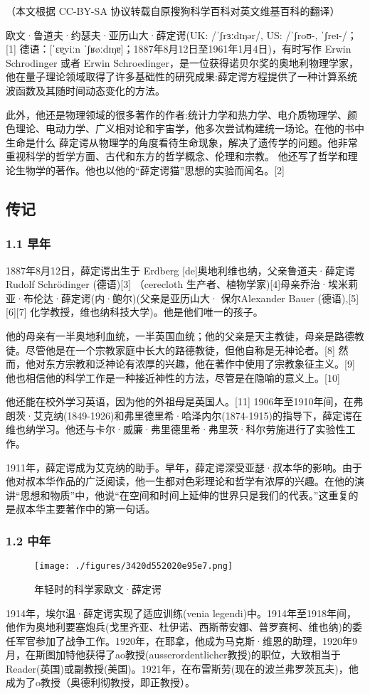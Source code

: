 
（本文根据 CC-BY-SA 协议转载自原搜狗科学百科对英文维基百科的翻译）


欧文·鲁道夫·约瑟夫·亚历山大·薛定谔(UK: /ˈʃrɜːdɪŋər/, US: /ˈʃroʊ-, ˈʃreɪ-/；[1] 德语：[ˈɛɐ̯viːn ˈʃʁøːdɪŋɐ]；1887年8月12日至1961年1月4日)，有时写作 Erwin Schrodinger 或者 Erwin Schroedinger，是一位获得诺贝尔奖的奥地利物理学家，他在量子理论领域取得了许多基础性的研究成果:薛定谔方程提供了一种计算系统波函数及其随时间动态变化的方法。

此外，他还是物理领域的很多著作的作者:统计力学和热力学、电介质物理学、颜色理论、电动力学、广义相对论和宇宙学，他多次尝试构建统一场论。在他的书中生命是什么 薛定谔从物理学的角度看待生命现象，解决了遗传学的问题。他非常重视科学的哲学方面、古代和东方的哲学概念、伦理和宗教。 他还写了哲学和理论生物学的著作。他也以他的“薛定谔猫”思想的实验而闻名。[2]

\subsection{传记}
\subsubsection{1.1 早年}
1887年8月12日，薛定谔出生于 Erdberg [de]奥地利维也纳，父亲鲁道夫·薛定谔 Rudolf Schrödinger (德语)[3] （cerecloth 生产者、植物学家)[4]母亲乔治·埃米莉亚·布伦达·薛定谔(内·鲍尔)(父亲是亚历山大· 保尔Alexander Bauer (德语),[5][6][7] 化学教授，维也纳科技大学)。他是他们唯一的孩子。

他的母亲有一半奥地利血统，一半英国血统；他的父亲是天主教徒，母亲是路德教徒。尽管他是在一个宗教家庭中长大的路德教徒，但他自称是无神论者。[8] 然而，他对东方宗教和泛神论有浓厚的兴趣，他在著作中使用了宗教象征主义。[9] 他也相信他的科学工作是一种接近神性的方法，尽管是在隐喻的意义上。[10]

他还能在校外学习英语，因为他的外祖母是英国人。[11] 1906年至1910年间，在弗朗茨·艾克纳(1849-1926)和弗里德里希·哈泽内尔(1874-1915)的指导下，薛定谔在维也纳学习。他还与卡尔·威廉·弗里德里希·弗里茨·科尔劳施进行了实验性工作。

1911年，薛定谔成为艾克纳的助手。早年，薛定谔深受亚瑟·叔本华的影响。由于他对叔本华作品的广泛阅读，他一生都对色彩理论和哲学有浓厚的兴趣。在他的演讲“思想和物质”中，他说“在空间和时间上延伸的世界只是我们的代表。”这重复的是叔本华主要著作中的第一句话。

\subsubsection{1.2 中年}
\begin{figure}[ht]
\centering
\texttt{[image: ./figures/3420d552020e95e7.png]}
\caption{年轻时的科学家欧文·薛定谔} \label{fig_Erwin_1}
\end{figure}
1914年，埃尔温·薛定谔实现了适应训练(venia legendi)中。1914年至1918年间，他作为奥地利要塞炮兵(戈里齐亚、杜伊诺、西斯蒂安娜、普罗赛柯、维也纳)的委任军官参加了战争工作。1920年，在耶拿，他成为马克斯·维恩的助理，1920年9月，在斯图加特他获得了ao教授(ausserordentlicher教授)的职位，大致相当于Reader(英国)或副教授(美国)。1921年，在布雷斯劳(现在的波兰弗罗茨瓦夫)，他成为了o教授（奥德利彻教授，即正教授）。

